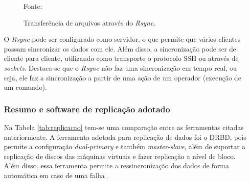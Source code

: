 \begin{figure}[h!]
 \centering
 \caption{Transferência de arquivos através do \textit{Rsync}.}
 Fonte: \citet{lopez2012}
 \label{fig:rsync}
\end{figure}


O \textit{Rsync} pode ser configurado como servidor, o que permite que vários clientes possam sincronizar os dados com ele. 
Além disso, a sincronização pode ser de cliente para cliente, utilizando como transporte o protocolo \ac{SSH} ou através de \textit{sockets}.
Destaca-se que o \textit{Rsync} não faz uma sincronização em tempo real, ou seja, ele faz a sincronização a partir de uma ação de um operador 
(execução de um comando).


\subsubsection{Resumo e software de replicação adotado}
\label{section:replicacaoescolhido}

Na Tabela \ref{tab:replicacao} tem-se uma comparação entre as ferramentas citadas anteriormente. 
A ferramenta adotada para replicação de dados foi o \ac{DRBD}, pois permite a configuração \textit{dual-primary} e também \textit{master-slave}, 
além de suportar a replicação de discos das máquinas virtuais e fazer replicação a nível de bloco. Além disso, essa ferramenta permite a 
ressincronização dos dados de forma automática em caso de uma falha \cite{drbd}.


